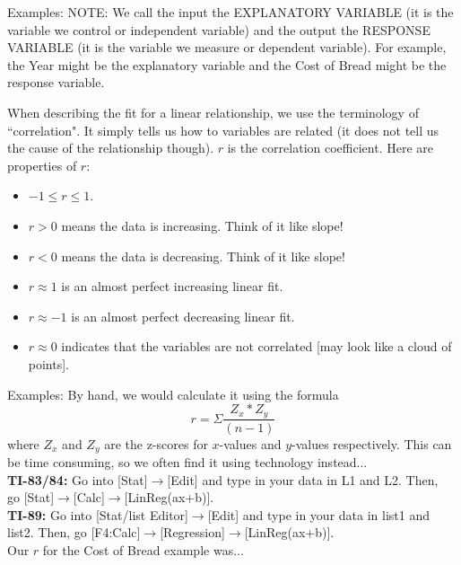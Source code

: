 \documentclass[12pt]{amsart}
\theoremstyle{definition}
\begin{document}
Examples: 
\vfill
\noindent NOTE: We call the input the EXPLANATORY VARIABLE (it is the variable we control or independent variable) and the output the RESPONSE VARIABLE (it is the variable we measure or dependent variable). For example, the Year might be the explanatory variable and the Cost of Bread might be the response variable.
\vspace{0.15in}
\newpage
\begin{framed} When describing the fit for a linear relationship, we use the terminology of ``correlation". It simply tells us how to variables are related (it does not tell us the cause of the relationship though). $r$ is the correlation coefficient. Here are properties of $r$:
\begin{itemize}
	\item $-1\leq r\leq 1$.
	\item $r>0$ means the data is increasing. Think of it like slope!
	\item $r<0$ means the data is decreasing. Think of it like slope!
	\item $r\approx 1$ is an almost perfect increasing linear fit.
	\item $r\approx -1$ is an almost perfect decreasing linear fit.
	\item $r\approx 0$ indicates that the variables are not correlated [may look like a cloud of points].
\end{itemize}
\end{framed}

Examples:
\vfill
\noindent By hand, we would calculate it using the formula $$r=\Sigma \frac{Z_x*Z_y}{(n-1)}$$ where $Z_x$ and $Z_y$ are the z-scores for $x$-values and $y$-values respectively. This can be time consuming, so we often find it using technology instead...\\
\noindent\textbf{TI-83/84:} Go into [Stat]$\rightarrow$[Edit] and type in your data in L1 and L2. Then,\\ go [Stat]$\rightarrow$[Calc]$\rightarrow$[LinReg(ax+b)].\\
\noindent\textbf{TI-89:} Go into [Stat/list Editor]$\rightarrow$[Edit] and type in your data in list1 and list2. Then, go [F4:Calc]$\rightarrow$[Regression]$\rightarrow$[LinReg(ax+b)].\\
Our $r$ for the Cost of Bread example was...
\end{document}
